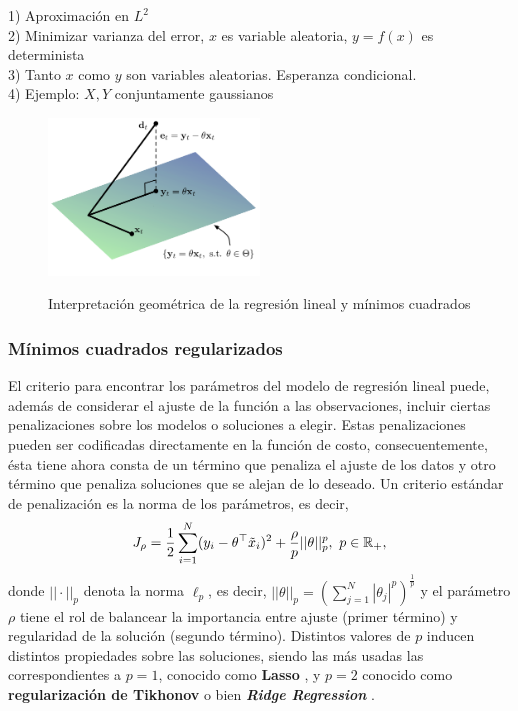 \begin{mdframed}[style=pendiente, frametitle={\center ¿Por qué usamos el criterio de mínimos cuadrados?}]
1) Aproximación en $L^2$\\
2) Minimizar varianza del error, $x$ es variable aleatoria, $y=f(x)$ es determinista\\
3) Tanto $x$ como $y$ son variables aleatorias. Esperanza condicional.\\
4) Ejemplo: $X,Y$ conjuntamente gaussianos

	
\end{mdframed}


\begin{figure}[ht]
	\centering
	\includegraphics[width=0.5\textwidth]{img/projection.pdf}\\
	\caption{Interpretación geométrica de la regresión lineal y mínimos cuadrados}
	\label{fig:projection}
\end{figure}


\subsubsection{Mínimos cuadrados regularizados} %
\label{ssub:min_cuad_reg}

El criterio para encontrar los parámetros del modelo de regresión lineal puede, además de considerar el ajuste de la función a las observaciones, incluir ciertas penalizaciones sobre los modelos o soluciones a elegir. Estas penalizaciones pueden ser codificadas directamente en la función de costo, consecuentemente, ésta tiene ahora consta de un término que penaliza el ajuste de los datos y otro término que penaliza soluciones que se alejan de lo deseado. Un criterio estándar de penalización es la norma de los parámetros, es decir, 
\begin{equation}
	J_\rho = \frac{1}{2}\sum_{i=1}^N(y_i-\theta^
	\top \tilde{x}_i)^2 + \frac{\rho}{p}||\theta||_p^p,\ p\in{\mathbb R}_+,
	\label{eq:reg_least_squares}
\end{equation} 
donde $||\cdot||_p$ denota la norma $\ell_p$, es decir, $||\theta||_p=\left(\sum_{j=1}^N|\theta_j|^p\right)^\frac{1}{p}$ y el parámetro $\rho$ tiene el rol de balancear la importancia entre ajuste (primer término) y regularidad de la solución (segundo término). Distintos valores de $p$ inducen distintos propiedades sobre las soluciones, siendo las más usadas las correspondientes a $p=1$, conocido como \textbf{Lasso} \cite{tibshirani_1996}, y $p=2$ conocido como \textbf{regularización de Tikhonov} \cite{tikhonov_arsenin_1977} o bien \textbf{\emph{Ridge Regression}} \cite{hoerl_kennard_1970}.  

